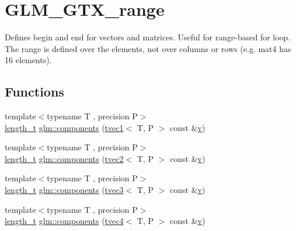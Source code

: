 \hypertarget{group__gtx__range}{}\section{G\+L\+M\+\_\+\+G\+T\+X\+\_\+range}
\label{group__gtx__range}


Defines begin and end for vectors and matrices. Useful for range-\/based for loop. The range is defined over the elements, not over columns or rows (e.\+g. mat4 has 16 elements).  


\subsection*{Functions}
\begin{DoxyCompactItemize}
\item 
{\footnotesize template$<$typename T , precision P$>$ }\\\mbox{\hyperlink{namespaceglm_a090a0de2260835bee80e71a702492ed9}{length\+\_\+t}} \mbox{\hyperlink{group__gtx__range_gab866f7e9055dafab616eb0fb3ec8d08e}{glm\+::components}} (\mbox{\hyperlink{structglm_1_1tvec1}{tvec1}}$<$ T, P $>$ const \&\mbox{\hyperlink{glad_8h_a14cfbe2fc2234f5504618905b69d1e06}{v}})
\item 
{\footnotesize template$<$typename T , precision P$>$ }\\\mbox{\hyperlink{namespaceglm_a090a0de2260835bee80e71a702492ed9}{length\+\_\+t}} \mbox{\hyperlink{group__gtx__range_gaa47e3ca3e374b418523be2898497e20f}{glm\+::components}} (\mbox{\hyperlink{structglm_1_1tvec2}{tvec2}}$<$ T, P $>$ const \&\mbox{\hyperlink{glad_8h_a14cfbe2fc2234f5504618905b69d1e06}{v}})
\item 
{\footnotesize template$<$typename T , precision P$>$ }\\\mbox{\hyperlink{namespaceglm_a090a0de2260835bee80e71a702492ed9}{length\+\_\+t}} \mbox{\hyperlink{group__gtx__range_gad1cb57e1fdaf433442f8fcb1811d02bc}{glm\+::components}} (\mbox{\hyperlink{structglm_1_1tvec3}{tvec3}}$<$ T, P $>$ const \&\mbox{\hyperlink{glad_8h_a14cfbe2fc2234f5504618905b69d1e06}{v}})
\item 
{\footnotesize template$<$typename T , precision P$>$ }\\\mbox{\hyperlink{namespaceglm_a090a0de2260835bee80e71a702492ed9}{length\+\_\+t}} \mbox{\hyperlink{group__gtx__range_ga8b88772fd866e0bc6e3df7456596ef0e}{glm\+::components}} (\mbox{\hyperlink{structglm_1_1tvec4}{tvec4}}$<$ T, P $>$ const \&\mbox{\hyperlink{glad_8h_a14cfbe2fc2234f5504618905b69d1e06}{v}})

\end{DoxyCompactItemize}
